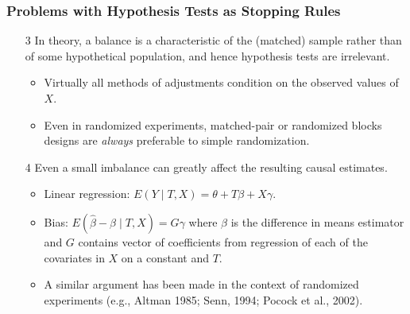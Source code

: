 \documentclass[trans]{beamer}
\begin{document}
\begin{frame}
  \frametitle{Problems with Hypothesis Tests as Stopping Rules}

  \begin{enumerate}
   \item[3] In theory, a balance is a characteristic of the (matched)
     sample rather than of some hypothetical population, and hence
     hypothesis tests are irrelevant.
     \begin{itemize}
     \item Virtually all methods of adjustments condition on the
       observed values of $X$.
     \item Even in randomized experiments, matched-pair or randomized
       blocks designs are {\it always} preferable to simple
       randomization.
     \end{itemize}

   \item[4] Even a small imbalance can greatly affect the resulting
   causal estimates.
   \begin{itemize}
   \item Linear regression: $E(Y \mid T, X) = \theta + T\beta +
     X\gamma$. 
   \item Bias: $E(\hat{\beta} - \beta \mid T, X) = G \gamma$ where
     $\hat{\beta}$ is the difference in means estimator and $G$
     contains vector of coefficients from regression of each of the
     covariates in $X$ on a constant and $T$.
   \item A similar argument has been made in the context of randomized
     experiments (e.g., Altman 1985; Senn, 1994; Pocock et al., 2002).
   \end{itemize}
   
   \end{enumerate}

\end{frame}

\end{document}
